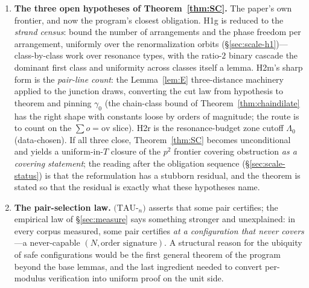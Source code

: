 \documentclass[11pt,a4paper]{article}
\numberwithin{equation}{section}
\theoremstyle{plain}
\theoremstyle{definition}
\theoremstyle{remark}
\begin{document}
\begin{enumerate}[leftmargin=1.7em,itemsep=4pt]

\item \textbf{The three open hypotheses of Theorem~\ref{thm:SC}.} The paper's
  own frontier, and now the program's closest obligation. H1g is reduced
  to the \emph{strand census}: bound the number of arrangements and the
  phase freedom per arrangement, uniformly over the renormalization
  orbits (\S\ref{sec:scale-h1})---class-by-class work over resonance
  types, with the ratio-$2$ binary cascade the dominant first class and
  uniformity across classes itself a lemma. H2m's sharp form is the
  \emph{pair-line count}: the Lemma~\ref{lem:E} three-distance
  machinery applied to the junction draws, converting the cut law from
  hypothesis to theorem and pinning $\gamma_0$ (the chain-class bound of
  Theorem~\ref{thm:chaindilate} has the right shape with constants loose
  by orders of magnitude; the route is to count on the
  $\sum o=\mathrm{ov}$ slice). H2r is the resonance-budget zone cutoff
  $\Lambda_0$ (data-chosen). If all three close, Theorem~\ref{thm:SC}
  becomes unconditional and yields a uniform-in-$T$ closure of the $p^2$
  frontier covering obstruction \emph{as a covering statement}; the
  reading after the obligation sequence
  (\S\ref{sec:scale-status}) is that the reformulation has a stubborn
  residual, and the theorem is stated so that the residual is exactly
  what these hypotheses name.

\item \textbf{The pair-selection law.} $(\mathrm{TAU}$-$_n)$ asserts that
  some pair certifies; the empirical law of \S\ref{sec:measure} says
  something stronger and unexplained: in every corpus measured, some pair
  certifies \emph{at a configuration that never covers}---a never-capable
  $(N,\text{order signature})$. A structural reason for the ubiquity of
  safe configurations would be the first general theorem of the program
  beyond the base lemmas, and the last ingredient needed to convert
  per-modulus verification into uniform proof on the unit side.


\end{enumerate}
\end{document}
